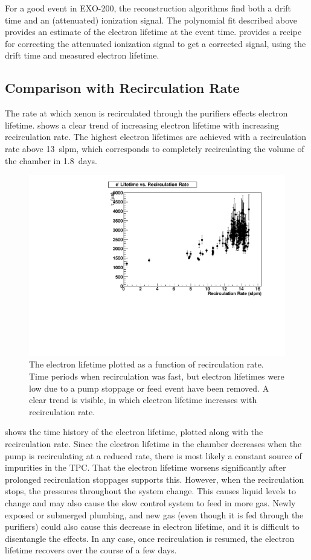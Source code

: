 \documentclass[herrin-thesis.tex]{subfiles}
\begin{document}
For a good event in EXO-200, the reconstruction algorithms find both a drift time and an (attenuated) ionization signal. The polynomial fit described above provides an estimate of the electron lifetime at the event time.  provides a recipe for correcting the attenuated ionization signal to get a corrected signal, using the drift time and measured electron lifetime.

\subsection{Comparison with Recirculation Rate}
The rate at which xenon is recirculated through the purifiers effects electron lifetime.  shows a clear trend of increasing electron lifetime with increasing recirculation rate. The highest electron lifetimes are achieved with a recirculation rate above \SI{13}{slpm}, which corresponds to completely recirculating the volume of the chamber in \SI{1.8}{days}.

\begin{figure}[htb]
\centering
\includegraphics[width=0.6\columnwidth]{./plots/el_vs_recirculation.pdf}
\caption[Electron lifetime vs. recirculation rate]{The electron lifetime plotted as a function of recirculation rate. Time periods when recirculation was fast, but electron lifetimes were low due to a pump stoppage or feed event have been removed. A clear trend is visible, in which electron lifetime increases with recirculation rate.}
\label{fig:el_vs_recirculation}
\end{figure}

 shows the time history of the electron lifetime, plotted along with the recirculation rate. Since the electron lifetime in the chamber decreases when the pump is recirculating at a reduced rate, there is most likely a constant source of impurities in the TPC. That the electron lifetime worsens significantly after prolonged recirculation stoppages supports this. However, when the recirculation stops, the pressures throughout the system change. This causes liquid levels to change and may also cause the slow control system to feed in more gas. Newly exposed or submerged plumbing, and new gas (even though it is fed through the purifiers) could also cause this decrease in electron lifetime, and it is difficult to disentangle the effects. In any case, once recirculation is resumed, the electron lifetime recovers over the course of a few days.
\end{document}

